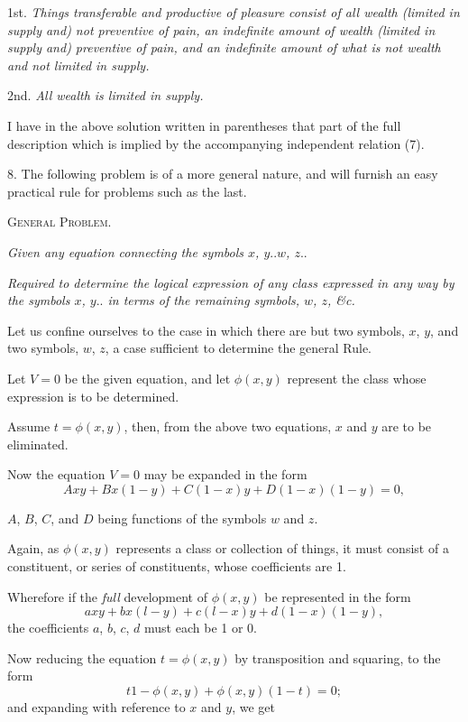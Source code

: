 \documentclass[oneside]{book}
\begin{document}
1st. \textit{Things transferable and productive of pleasure consist of
all wealth (limited in supply and) not preventive of pain, an
indefinite amount of wealth (limited in supply and) preventive of pain,
and an indefinite amount of what is not wealth and not limited in
supply.}

2nd. \textit{All wealth is limited in supply.}

I have in the above solution written in parentheses that part
of the full description which is implied by the accompanying
independent relation (7).

8. The following problem is of a more general nature, and
will furnish an easy practical rule for problems such as the last.

\begin{center}
\textsc{General Problem}.
\end{center}

\textit{Given any equation connecting the symbols $x$, $y..w$, $z..$}

\textit{Required to determine the logical expression of any class
expressed in any way by the symbols $x$, $y..$ in terms of the remaining
symbols, $w$, $z$, \&c.}

Let us confine ourselves to the case in which there are but
two symbols, $x$, $y$, and two symbols, $w$, $z$, a case sufficient to
determine the general Rule.

Let $V=0$ be the given equation, and let $\phi (x,y)$ represent
the class whose expression is to be determined.

Assume $t = \phi (x,y)$, then, from the above two equations, $x$
and $y$ are to be eliminated.

Now the equation $V=0$ may be expanded in the form
\setcounter{equation}{0}
\begin{equation}
Axy + Bx(1-y) + C(1-x)y + D(1-x) (1-y) = 0,
\end{equation}

$A$, $B$, $C$, and $D$ being functions of the symbols $w$ and $z$.

Again, as $\phi (x,y)$ represents a class or collection of things, it
must consist of a constituent, or series of constituents, whose
coefficients are 1.

Wherefore if the \textit{full} development of $\phi (x, y)$ be represented in the form
\[
axy+ bx(l - y) + c(l - x)y + d(1 - x) (1 - y),
\]
the coefficients $a$, $b$, $c$, $d$ must each be 1 or 0.

Now reducing the equation $t = \phi (x, y)$ by transposition and
squaring, to the form
\[
t{1-\phi(x,y)} + \phi(x,y)(1-t) = 0;
\]
and expanding with reference to $x$ and $y$, we get
\end{document}
